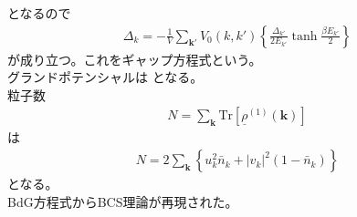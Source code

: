 \documentclass[dvipdfmx, 11pt, a4paper]{jsarticle}
\numberwithin{equation}{section}
\theoremstyle{definition}
\begin{document}
    となるので
    \begin{align}
        \Delta_k = -\frac{1}{V}  \sum_{\bm{k}'} V_0(k,k')\left\{   \frac{\Delta_{k'}}{2E_{k'}}\tanh \frac{\beta E_{k'}}{2}\right\} 
    \end{align}
    が成り立つ。これをギャップ方程式という。\\
    グランドポテンシャルは
    となる。\\
    粒子数
    \begin{align}
        N = \sum_{\bm{k}} \mathrm{Tr}[\underline{\rho}^{(1)}(\bm{k})] 
    \end{align}
    は
    \begin{align}
        N=2\sum_{\bm{k}} \left\{ u_k^2 \bar{n}_k + |v_k|^2(1-\bar{n}_k) \right\}
    \end{align}
    となる。\\
    BdG方程式からBCS理論が再現された。
\end{document}
